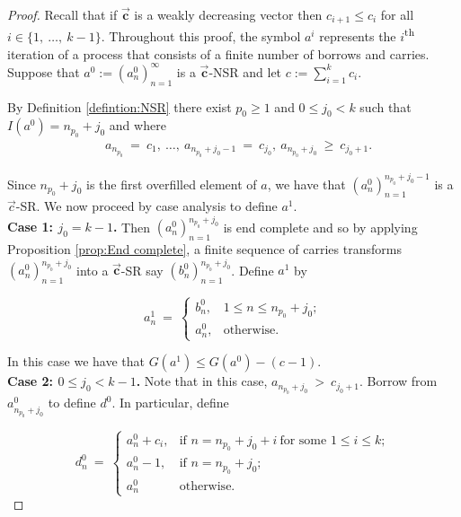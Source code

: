 \documentclass[10pt,a4paper]{amsart}
\newcommand{\vtr}[1]{\vec{\mathbf{#1}}}
\begin{document}
\begin{proof}

Recall that if $\vtr{c}$ is a weakly decreasing vector then $c_{i+1} \leq c_i$ for all $i \in \{1,\ \ldots,\ k-1 \}$. 
Throughout this proof,  the symbol $a^{i}$ represents the $i$\textsuperscript{th} iteration of a process that consists of a finite number of borrows and carries.
Suppose that $a^{0}:=( a_n^{0} )_{n=1}^{\infty}$ is a $\vtr{c}$-NSR and let $c:=\sum_{i=1}^k c_i$.

By Definition \textcolor{blue}{\ref{defintion:NSR}} there exist $ p_0\geq 1$ and $0\leq j_0< k$ such that $I(a^0)=n_{p_0}+j_0$ and where
\begin{align}
    & a_{n_{p_0}}\ =\ c_1,\ \ldots,\ a_{n_{p_0} + j_0 -1}\ =\ c_{j_0},\  a_{n_{p_0}  + j_0}\ \geq \ c_{j_0+1}. \label{eq:3} 
\end{align}

Since $n_{p_0}+j_0$ is the first overfilled element of $a$, we have that $(a_n^0)_{n=1}^{n_{p_0} + j_0-1}$ is a $\vec{c}$-SR. We now proceed by case analysis to define $a^1$.\\ 

    \noindent \textbf{Case 1: $j_0=k-1$.} Then $(a_n^0)_{n=1}^{n_{p_0} + j_0}$ is end complete and so by applying Proposition \textcolor{blue}{\ref{prop:End complete}}, a finite sequence of carries transforms $(a_n^0)_{n=1}^{n_{p_0} + j_0}$ into a $\vtr{c}$-SR say $(b^{0}_n)_{n=1}^{n_{p_0} + j_0}$. Define $a^1$ by

    $$a_n^{1}\ =\ \begin{cases}
        b^0_n, & 1\leq n\leq n_{p_0}+j_0;\\
        a_n^0, & \text{otherwise.}
    \end{cases}$$

    \noindent In this case we have that $G(a^1)\leq G(a^0)-(c-1)$.\\

   \noindent \textbf{Case 2: $0\leq j_0<k-1$.} Note that in this case, $a_{n_{p_0}  + j_0}\ > \ c_{j_0+1}$. Borrow from $a_{n_{p_0}+j_0}^0$ to define $d^0$. In particular, define

    $$d^0_n\ =\ \begin{cases}
        a_n^0+c_i, & \text{if } n=n_{p_0}+j_0+i\ \text{for some }1\leq i\leq k;\\
        a_n^0-1, & \text{if } n=n_{p_0}+j_0;\\
        a_n^0 & \text{otherwise.}
    \end{cases}$$   
   

\end{proof}
\end{document}
